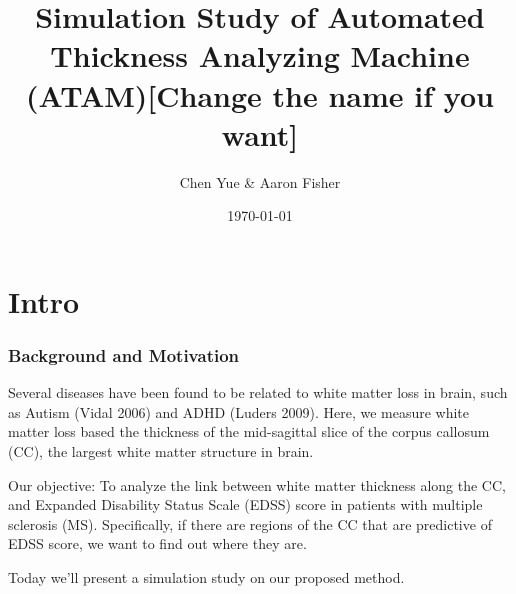 \documentclass[9 pt]{beamer}
\title[Thickness Analysis]{Simulation Study of Automated Thickness Analyzing Machine (ATAM)[Change the name if you want]}
\author[YUE \& FISHER]{Chen Yue \& Aaron Fisher}
\institute[JHU Biostatictics]{Johns Hopkins Bloomberg School of Public Health\\Department of Biostatistics}
\date{\today}
\begin{document}
\begin{frame}
\titlepage
\end{frame}

\section*{Intro}
\begin{frame}
\frametitle{Background and Motivation}

Several diseases have been found to be related to white matter loss in brain, such as Autism (Vidal 2006) and ADHD (Luders 2009). Here, we measure white matter loss based the thickness of the mid-sagittal slice of the corpus callosum (CC), the largest white matter structure in brain.\vspace{.3cm}

Our objective: To analyze the link between white matter thickness along the CC, and Expanded Disability Status Scale (EDSS) score in patients with multiple sclerosis (MS). Specifically, if there are regions of the CC that are predictive of EDSS score, we want to find out where they are. \vspace{.3cm}

Today we'll present a simulation study on our proposed method.
\end{frame}
\end{document}
